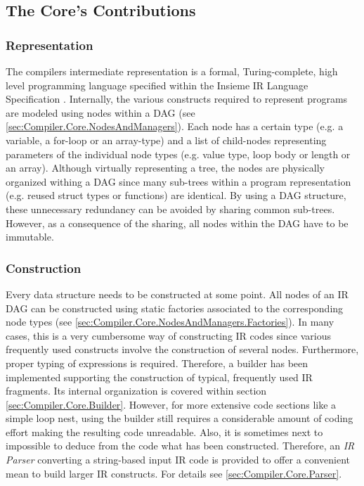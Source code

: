 \subsection{The Core's Contributions}
\subsubsection{Representation}
The compilers intermediate representation is a formal, Turing-complete,
high level programming language specified within the Insieme IR
Language Specification \cite{insieme_ir_spec}. Internally, the various
constructs required to represent programs are modeled using nodes within a DAG 
(see \ref{sec:Compiler.Core.NodesAndManagers}). Each node has a certain type
(e.g. a variable, a for-loop or an array-type) and a list of child-nodes
representing parameters of the individual node types (e.g. value type, loop
body or length or an array). Although virtually representing a tree, the nodes
are physically organized withing a DAG since many sub-trees within a program
representation (e.g. reused struct types or functions) are identical. By using a
DAG structure, these unnecessary redundancy can be avoided by sharing common
sub-trees. However, as a consequence of the sharing, all nodes within the DAG
have to be immutable.

\subsubsection{Construction}
Every data structure needs to be constructed at some point. All nodes of an IR
DAG can be constructed using static factories associated to the corresponding
node types (see \ref{sec:Compiler.Core.NodesAndManagers.Factories}). In many
cases, this is a very cumbersome way of constructing IR codes since various
frequently used constructs involve the construction of several nodes.
Furthermore, proper typing of expressions is required. Therefore, a builder has
been implemented supporting the construction of typical, frequently used IR
fragments. Its internal organization is covered within section
\ref{sec:Compiler.Core.Builder}. However, for more extensive code sections like
a simple loop nest, using the builder still requires a considerable amount of
coding effort making the resulting code unreadable. Also, it is sometimes next
to impossible to deduce from the code what has been constructed. Therefore, an
\textit{IR Parser} converting a string-based input IR code is provided to offer
a convenient mean to build larger IR constructs. For details see
\ref{sec:Compiler.Core.Parser}.

